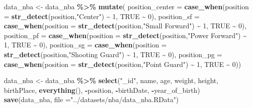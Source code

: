 \documentclass[
]{book}
\newenvironment{Shaded}{\begin{snugshade}}{\end{snugshade}}
\newcommand{\AttributeTok}[1]{\textcolor[rgb]{0.13,0.29,0.53}{#1}}
\newcommand{\ConstantTok}[1]{\textcolor[rgb]{0.56,0.35,0.01}{#1}}
\newcommand{\DecValTok}[1]{\textcolor[rgb]{0.00,0.00,0.81}{#1}}
\newcommand{\FunctionTok}[1]{\textcolor[rgb]{0.13,0.29,0.53}{\textbf{#1}}}
\newcommand{\NormalTok}[1]{#1}
\newcommand{\OtherTok}[1]{\textcolor[rgb]{0.56,0.35,0.01}{#1}}
\newcommand{\SpecialCharTok}[1]{\textcolor[rgb]{0.81,0.36,0.00}{\textbf{#1}}}
\newcommand{\StringTok}[1]{\textcolor[rgb]{0.31,0.60,0.02}{#1}}
\begin{document}
\begin{Shaded}
\begin{Highlighting}[]
\NormalTok{data\_nba }\OtherTok{\textless{}{-}}\NormalTok{ data\_nba }\SpecialCharTok{\%\textgreater{}\%}
  \FunctionTok{mutate}\NormalTok{(}
    \AttributeTok{position\_center =} 
      \FunctionTok{case\_when}\NormalTok{(}\AttributeTok{position =} \FunctionTok{str\_detect}\NormalTok{(position,}\StringTok{"Center"}\NormalTok{) }\SpecialCharTok{\textasciitilde{}} \DecValTok{1}\NormalTok{,}
                \ConstantTok{TRUE} \SpecialCharTok{\textasciitilde{}} \DecValTok{0}\NormalTok{),}
    \AttributeTok{position\_sf =} 
      \FunctionTok{case\_when}\NormalTok{(}\AttributeTok{position =} \FunctionTok{str\_detect}\NormalTok{(position,}\StringTok{"Small Forward"}\NormalTok{) }\SpecialCharTok{\textasciitilde{}} \DecValTok{1}\NormalTok{,}
                \ConstantTok{TRUE} \SpecialCharTok{\textasciitilde{}} \DecValTok{0}\NormalTok{),}
    \AttributeTok{position\_pf =} 
      \FunctionTok{case\_when}\NormalTok{(}\AttributeTok{position =} \FunctionTok{str\_detect}\NormalTok{(position,}\StringTok{"Power Forward"}\NormalTok{) }\SpecialCharTok{\textasciitilde{}} \DecValTok{1}\NormalTok{,}
                \ConstantTok{TRUE} \SpecialCharTok{\textasciitilde{}} \DecValTok{0}\NormalTok{),}
    \AttributeTok{position\_sg =} 
      \FunctionTok{case\_when}\NormalTok{(}\AttributeTok{position =} \FunctionTok{str\_detect}\NormalTok{(position,}\StringTok{"Shooting Guard"}\NormalTok{) }\SpecialCharTok{\textasciitilde{}} \DecValTok{1}\NormalTok{,}
                \ConstantTok{TRUE} \SpecialCharTok{\textasciitilde{}} \DecValTok{0}\NormalTok{),}
    \AttributeTok{position\_pg =} 
      \FunctionTok{case\_when}\NormalTok{(}\AttributeTok{position =} \FunctionTok{str\_detect}\NormalTok{(position,}\StringTok{"Point Guard"}\NormalTok{) }\SpecialCharTok{\textasciitilde{}} \DecValTok{1}\NormalTok{,}
                \ConstantTok{TRUE} \SpecialCharTok{\textasciitilde{}} \DecValTok{0}\NormalTok{))}



\NormalTok{data\_nba }\OtherTok{\textless{}{-}}\NormalTok{ data\_nba }\SpecialCharTok{\%\textgreater{}\%}
  \FunctionTok{select}\NormalTok{(}\StringTok{"\_id"}\NormalTok{, name, age, weight, height, birthPlace, }\FunctionTok{everything}\NormalTok{(), }\SpecialCharTok{{-}}\NormalTok{position, }\SpecialCharTok{{-}}\NormalTok{birthDate, }\SpecialCharTok{{-}}\NormalTok{year\_of\_birth)}
\FunctionTok{save}\NormalTok{(data\_nba, }\AttributeTok{file =}\StringTok{"../datasets/nba/data\_nba.RData"}\NormalTok{)}
\end{Highlighting}
\end{Shaded}
\end{document}
